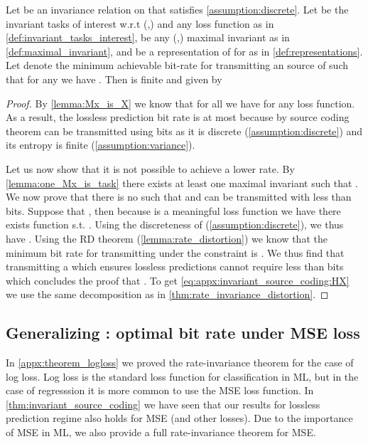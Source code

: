 \documentclass[final]{article}
\begin{document}
\begin{theorem}\label{thm:invariant_source_coding}
Let  be an invariance relation on  that satisfies \cref{assumption:discrete}.
Let  be the invariant tasks of interest w.r.t (,) and any loss function  as in \cref{def:invariant_tasks_interest},  be any (,) maximal invariant as in \cref{def:maximal_invariant}, and  be a representation of  for  as in \cref{def:representations}.
Let  denote the minimum achievable bit-rate for transmitting an \iid source of  such that for any  we have .
Then   is finite and given by

\end{theorem}
\begin{proof}
By \cref{lemma:Mx_is_X}  we know that for all  we have   for any loss function.
As a result, the lossless prediction bit rate is at most  because by  source coding theorem   can be transmitted using  bits as it is discrete (\cref{assumption:discrete}) and its entropy is finite (\cref{assumption:variance}).
 
Let us now show that it is not possible to achieve a lower rate.
By \cref{lemma:one_Mx_is_task} there exists at least one maximal invariant such that .
We now prove that there is no  such that  and can be transmitted with less than  bits.
Suppose that ,  then because  is a meaningful loss function we have there exists  function  s.t. .
Using the discreteness of   (\cref{assumption:discrete}), we thus have .
Using the RD theorem (\cref{lemma:rate_distortion}) we know that the minimum bit rate for transmitting  under the constraint  is .
We thus find that transmitting a  which ensures lossless predictions cannot require less  than  bits which concludes the proof that .
To get \cref{eq:appx:invariant_source_coding:HX} we use the same decomposition as in \cref{thm:rate_invariance_distortion}.
\end{proof}


\subsection{Generalizing \texorpdfstring{}{Theorem 2}: optimal bit rate under MSE loss}
\label{appx:theorem_mse}


In \cref{appx:theorem_logloss} we proved the rate-invariance theorem for the case of log loss.
Log loss is the standard loss function for classification in ML, but in the case of regresssion it is more common to use the MSE loss function.
In \cref{thm:invariant_source_coding} we have seen that our results for lossless prediction regime also holds for MSE (and other losses).
Due to the importance of MSE in ML, we also provide a full rate-invariance theorem for MSE. 
\end{document}
